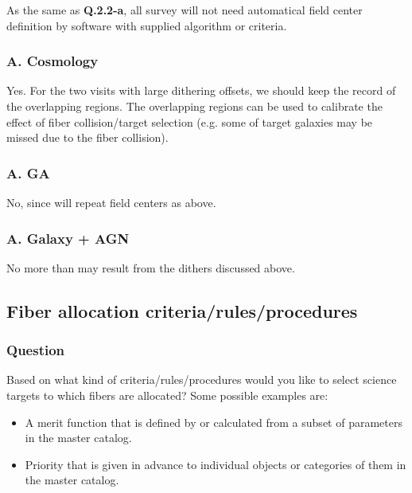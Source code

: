 \documentclass[a4paper,notitlepage]{article}
\begin{document}
As the same as {\bf Q.2.2-a}, all survey will not need automatical field center 
definition by software with supplied algorithm or criteria. 


\subsubsection{A. Cosmology}

Yes. For the two visits with large dithering offsets, we should
keep the record of the overlapping regions. The overlapping regions
can be used to calibrate the effect of fiber collision/target
selection (e.g. some of target galaxies may be missed due to the fiber
collision).

\subsubsection{A. GA}
No, since will repeat field centers as above. 

\subsubsection{A. Galaxy + AGN}
No more than may result from the dithers discussed above.


\renewcommand{\thesubsection}{Q.2.3-\alph{subsection}}
\setcounter{subsection}{0}
\subsection{Fiber allocation criteria/rules/procedures}

\subsubsection{Question}
Based on what kind of criteria/rules/procedures would
           you like to select science targets to which fibers are
           allocated? Some possible examples are:
           \begin{itemize}
        \item A merit function that is defined by or calculated from 
              a subset of
              parameters in the master catalog.
        \item Priority that is given in advance to individual
              objects or categories of them in the master
              catalog.
           \end{itemize}
\end{document}
